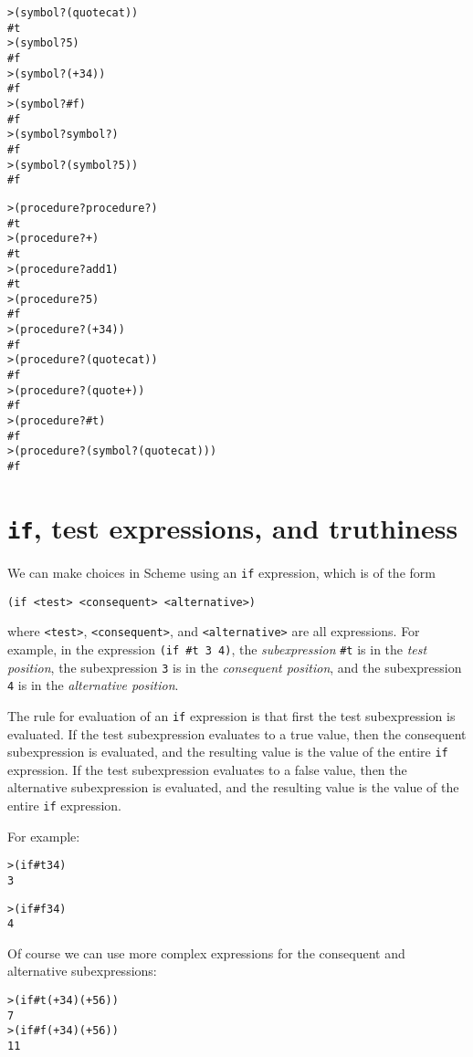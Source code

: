 \documentclass{book}
\begin{document}
\begin{alltt}
> (symbol? (quote cat))
#t
> (symbol? 5)
#f
> (symbol? (+ 3 4))
#f
> (symbol? #f)
#f
> (symbol? symbol?)
#f
> (symbol? (symbol? 5))
#f
\end{alltt}

\begin{alltt}
> (procedure? procedure?)
#t
> (procedure? +)
#t
> (procedure? add1)
#t
> (procedure? 5)
#f
> (procedure? (+ 3 4))
#f
> (procedure? (quote cat))
#f
> (procedure? (quote +))
#f
> (procedure? #t)
#f
> (procedure? (symbol? (quote cat)))
#f
\end{alltt}  


\section{\texttt{if}, test expressions, and truthiness}

We can make choices in Scheme using an \verb|if| expression, which is of the form

\verb|(if <test> <consequent> <alternative>)|

\noindent
where \verb|<test>|, \verb|<consequent>|, and \verb|<alternative>| are all expressions.
%
For example, in the expression \verb|(if #t 3 4)|, the \emph{subexpression} \verb|#t| is in the \emph{test position}, the subexpression \verb|3| is in the \emph{consequent position}, and the subexpression \verb|4| is in the \emph{alternative position}.

The rule for evaluation of an \verb|if| expression is that first the test subexpression is evaluated.  If the test subexpression evaluates to a true value, then the consequent subexpression is evaluated, and the resulting value is the value of the entire \verb|if| expression.  If the test subexpression evaluates to a false value, then the alternative subexpression is evaluated, and the resulting value is the value of the entire \verb|if| expression.

For example:

\begin{alltt}
> (if #t 3 4)
3
\end{alltt}
  
\begin{alltt}
> (if #f 3 4)
4
\end{alltt}

Of course we can use more complex expressions for the consequent and alternative subexpressions:

\begin{alltt}
> (if #t (+ 3 4) (+ 5 6))
7
> (if #f (+ 3 4) (+ 5 6))
11
\end{alltt}
\end{document}
